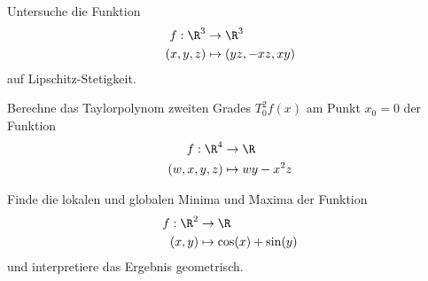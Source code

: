 \vspace{0.3cm}

\begin{prob}
Untersuche die Funktion
\begin{equation*}
        \begin{split}
            f:\R^3&\to\R^3\\
            (x,y,z)&\mapsto (yz, -xz, xy)
        \end{split}
    \end{equation*}
 auf Lipschitz-Stetigkeit.
\end{prob}

\vspace{0.3cm}

\begin{prob}
Berechne das Taylorpolynom zweiten Grades $T_0^2f(x)$ am Punkt $x_0=0$ der Funktion
\begin{equation*}
        \begin{split}
            f:\R^4&\to\R\\
            (w,x,y,z) &\mapsto wy-x^2z
        \end{split}
    \end{equation*}
\end{prob}

\vspace{0.3cm}

\begin{prob}
Finde die lokalen und globalen Minima und Maxima der Funktion
\begin{equation*}
        \begin{split}
            f:\R^2&\to\R\\
            (x,y) &\mapsto \cos(x)+\sin(y)
        \end{split}
    \end{equation*}
und interpretiere das Ergebnis geometrisch.
\end{prob}

\vspace{0.3cm}

